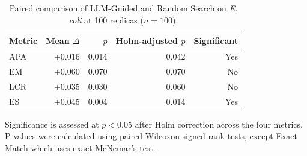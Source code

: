 \begin{table}[!tb]
  \centering
  \caption{Paired comparison of LLM-Guided and Random Search on {\normalfont\itshape E. coli} at 100 replicas ($n=100$).}
  \label{tab:llm_random_significance_ecoli_r100}
  \scriptsize
  \setlength{\tabcolsep}{4pt}
  \begin{tabular}{lrrrr}
    \toprule
    Metric & Mean $\Delta$ & $p$ & Holm-adjusted $p$ & Significant \\
    \midrule
    APA & +0.016 & 0.014 & 0.042 & Yes \\
    EM & +0.060 & 0.070 & 0.070 & No \\
    LCR & +0.035 & 0.030 & 0.060 & No \\
    ES & +0.045 & 0.004 & 0.014 & Yes \\
    \bottomrule
  \end{tabular}
  \par\smallskip\footnotesize{Significance is assessed at $p<0.05$ after Holm correction across the four metrics. P-values were calculated using paired Wilcoxon signed-rank tests, except Exact Match which uses exact McNemar's test.}
\end{table}
